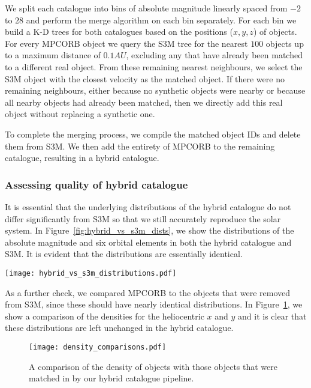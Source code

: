 We split each catalogue into bins of absolute magnitude linearly spaced from $-2$ to $28$ and perform the merge algorithm on each bin separately. For each bin we build a K-D trees for both catalogues based on the positions ($x, y, z$) of objects. For every MPCORB object we query the S3M tree for the nearest $100$ objects up to a maximum distance of $0.1 \unit{AU}$, excluding any that have already been matched to a different real object. From these remaining nearest neighbours, we select the S3M object with the closest velocity as the matched object. If there were no remaining neighbours, either because no synthetic objects were nearby or because all nearby objects had already been matched, then we directly add this real object without replacing a synthetic one.

To complete the merging process, we compile the matched object IDs and delete them from S3M. We then add the entirety of MPCORB to the remaining catalogue, resulting in a hybrid catalogue.

\subsubsection{Assessing quality of hybrid catalogue}
It is essential that the underlying distributions of the hybrid catalogue do not differ significantly from S3M so that we still accurately reproduce the solar system. In Figure~\ref{fig:hybrid_vs_s3m_dists}, we show the distributions of the absolute magnitude and six orbital elements in both the hybrid catalogue and S3M. It is evident that the distributions are essentially identical.

\begin{figure*}[htb]
    \centering
    \texttt{[image: hybrid\_vs\_s3m\_distributions.pdf]}
    \caption{A comparison of the parameter distributions of S3M and the hybrid catalogue.}
    \label{fig:hybrid_vs_s3m_dists}
\end{figure*}

As a further check, we compared MPCORB to the objects that were removed from S3M, since these should have nearly identical distributions. In Figure~\ref{fig:density_compare}, we show a comparison of the densities for the heliocentric $x$ and $y$ and it is clear that these distributions are left unchanged in the hybrid catalogue.

\begin{figure}[htb]
    \centering
    \texttt{[image: density\_comparisons.pdf]}
    \caption{A comparison of the density of \mpco{} objects with those objects that were matched in \sss{} by our hybrid catalogue pipeline.}
    \label{fig:density_compare}
\end{figure}

